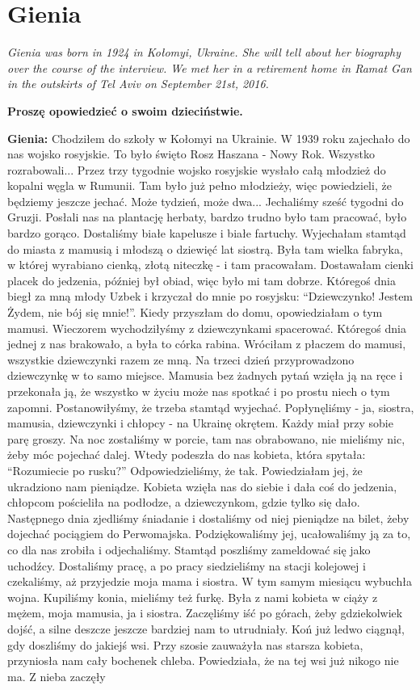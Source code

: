 \section{Gienia}
\begin{otherlanguage}{polish}
\textit{Gienia was born in 1924 in Kołomyi, Ukraine. She will tell about her biography over the course of the interview. We met her in a retirement home in Ramat Gan in the outskirts of Tel Aviv on September 21st, 2016.}\par
\vspace*{2em}
\textbf{Proszę opowiedzieć o swoim dzieciństwie.}

\textbf{Gienia:} Chodziłem do szkoły w Kołomyi na Ukrainie. W 1939 roku zajechało do nas wojsko rosyjskie. To było święto Rosz Haszana - Nowy Rok. Wszystko rozrabowali... Przez trzy tygodnie wojsko rosyjskie wysłało całą młodzież do kopalni węgla w Rumunii. Tam było już pełno młodzieży, więc powiedzieli, że będziemy jeszcze jechać. Może tydzień, może dwa... Jechaliśmy sześć tygodni do Gruzji. Posłali nas na plantację herbaty, bardzo trudno było tam pracować, było bardzo gorąco. Dostaliśmy białe kapelusze i białe fartuchy. Wyjechałam stamtąd do miasta z mamusią i młodszą o dziewięć lat siostrą. Była tam wielka fabryka, w której wyrabiano cienką, złotą niteczkę - i tam pracowałam. Dostawałam cienki placek do jedzenia, później był obiad, więc było mi tam dobrze. Któregoś dnia biegł za mną młody Uzbek i krzyczał do mnie po rosyjsku: "`Dziewczynko! Jestem Żydem, nie bój się mnie!"'. Kiedy przyszłam do domu, opowiedziałam o tym mamusi. Wieczorem wychodziłyśmy z dziewczynkami spacerować. Któregoś dnia jednej z nas brakowało, a była to córka rabina. Wróciłam z płaczem do mamusi, wszystkie dziewczynki razem ze mną. Na trzeci dzień przyprowadzono dziewczynkę w to samo miejsce. Mamusia bez żadnych pytań wzięła ją na ręce i przekonała ją, że wszystko w życiu może nas spotkać i po prostu niech o tym zapomni. Postanowiłyśmy, że trzeba stamtąd wyjechać. Popłynęliśmy - ja, siostra, mamusia, dziewczynki i chłopcy - na Ukrainę okrętem. Każdy miał przy sobie parę groszy. Na noc zostaliśmy w porcie, tam nas obrabowano, nie mieliśmy nic, żeby móc pojechać dalej. Wtedy podeszła do nas kobieta, która spytała: "`Rozumiecie po rusku?"' Odpowiedzieliśmy, że tak. Powiedziałam jej, że ukradziono nam pieniądze. Kobieta wzięła nas do siebie i dała coś do jedzenia, chłopcom pościeliła na podłodze, a dziewczynkom, gdzie tylko się dało. Następnego dnia zjedliśmy śniadanie i dostaliśmy od niej pieniądze na bilet, żeby dojechać pociągiem do Perwomajska. Podziękowaliśmy jej, ucałowaliśmy ją za to, co dla nas zrobiła i odjechaliśmy. Stamtąd poszliśmy zameldować się jako uchodźcy. Dostaliśmy pracę, a po pracy siedzieliśmy na stacji kolejowej i czekaliśmy, aż przyjedzie moja mama i siostra. W tym samym miesiącu wybuchła wojna. Kupiliśmy konia, mieliśmy też furkę. Była z nami kobieta w ciąży z mężem, moja mamusia, ja i siostra. Zaczęliśmy iść po górach, żeby gdziekolwiek dojść, a silne deszcze jeszcze bardziej nam to utrudniały. Koń już ledwo ciągnął, gdy doszliśmy do jakiejś wsi. Przy szosie zauważyła nas starsza kobieta, przyniosła nam cały bochenek chleba. Powiedziała, że na tej wsi już nikogo nie ma. Z nieba zaczęły 
\end{otherlanguage}
